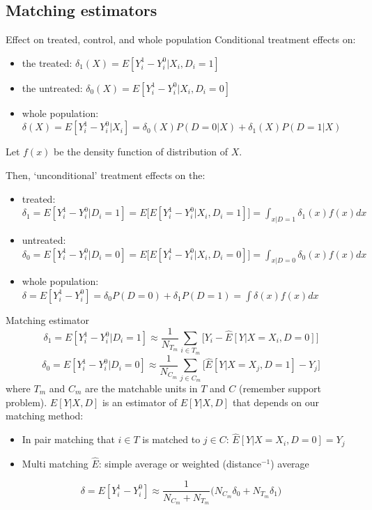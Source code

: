 \documentclass[handout]{beamer}
\begin{document}
\subsection{Matching estimators}
\begin{frame}{Effect on treated, control, and whole population}
Conditional treatment effects on:
\begin{itemize}
	\item the treated: $\delta_1(X)=E[Y^1_i-Y^0_i|X_i,D_i=1]$
	\item the untreated: $\delta_0(X)=E[Y^1_i-Y^0_i|X_i,D_i=0]$	
	\item whole population: $\delta(X)=E[Y^1_i-Y^0_i|X_i]=\delta_0(X)P(D=0|X)+\delta_1(X)P(D=1|X)$	
\end{itemize} \pause \bigskip

Let $f(x)$ be the density function of distribution of $X$.\medskip

Then, `unconditional' treatment effects on the:
\begin{itemize}
	\item treated: $\delta_1=E[Y^1_i-Y^0_i|D_i=1]=E\big[E[Y^1_i-Y^0_i|X_i,D_i=1]\big]=\int_{x|D=1} \delta_1(x)f(x)dx$
	\item untreated: $\delta_0=E[Y^1_i-Y^0_i|D_i=0]=E\big[E[Y^1_i-Y^0_i|X_i,D_i=0]\big]=\int_{x|D=0} \delta_0(x)f(x)dx$	
	\item whole population: $\delta=E[Y^1_i-Y^0_i]=\delta_0P(D=0)+\delta_1P(D=1)=\int \delta(x)f(x)dx$	
\end{itemize} 

\end{frame}
 

\begin{frame}{Matching estimator}
	\[\delta_1=E[Y^1_i-Y^0_i|D_i=1] \approx \frac{1}{N_{T_m}}\sum_{i\in{T_m}}\Big[Y_i-\hat{E}[Y|X=X_i,D=0] \Big]\]
	\[\delta_0=E[Y^1_i-Y^0_i|D_i=0] \approx \frac{1}{N_{C_m}}\sum_{j\in{C_m}}\Big[\hat{E}[Y|X=X_j,D=1]-Y_j \Big]\]
	where $T_m$ and $C_m$ are the matchable units in $T$ and $C$ (remember support problem).
	$\hat{E}[Y|X,D]$ is an estimator of $E[Y|X,D]$ that depends on our matching method:
	\begin{itemize}
		\item In pair matching that $i\in T$ is matched to $j\in C$: $\hat{E}[Y|X=X_i,D=0]=Y_{j}$
		\item Multi matching $\hat{E}$: simple average or weighted (distance$^{-1}$) average 
	\end{itemize}
	
	\[\delta=E[Y^1_i-Y^0_i] \approx \frac{1 }{N_{C_m}+N_{T_m}}\Big(N_{C _m} \delta_0 + N_{T_m} \delta_1 \Big) \]
\end{frame}
\end{document}
